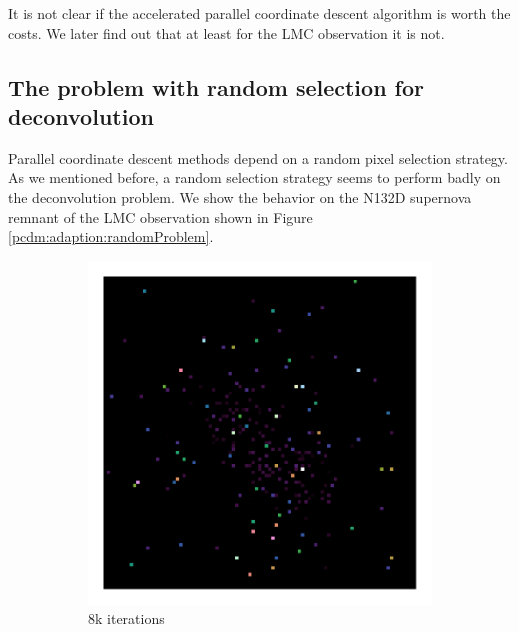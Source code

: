 It is not clear if the accelerated parallel coordinate descent algorithm is worth the costs. We later find out that at least for the LMC observation it is not.



\subsection{The problem with random selection for deconvolution} \label{pcdm:adaption}
Parallel coordinate descent methods depend on a random pixel selection strategy. As we mentioned before, a random selection strategy seems to perform badly on the deconvolution problem. We show the behavior on the N132D supernova remnant of the LMC observation shown in Figure \ref{pcdm:adaption:randomProblem}.

\begin{figure}[h]
		\centering
	\begin{subfigure}[b]{0.245\linewidth}
		\includegraphics[width=1.00\linewidth, clip, trim= 0.25in 0.25in 0.25in 0.25in]{./chapters/05.pcdm/randomProblem/random_1k_block1.png}
		\caption{8k iterations}
		\label{pcdm:adaption:randomProblem:block11}
	\end{subfigure}
	\begin{subfigure}[b]{0.245\linewidth}

\end{subfigure}
\end{figure}
